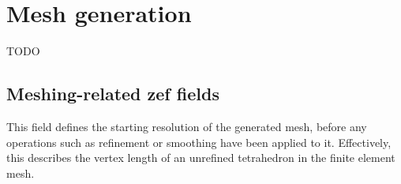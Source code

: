 \section{Mesh generation}\label{sec:mesh-generation}

TODO


\subsection{Meshing-related zef fields}\label{ssec:meshing-fields}

 This field defines the starting resolution
of the generated mesh, before any operations such as refinement or smoothing
have been applied to it. Effectively, this describes the vertex length of an
unrefined tetrahedron in the finite element mesh.
